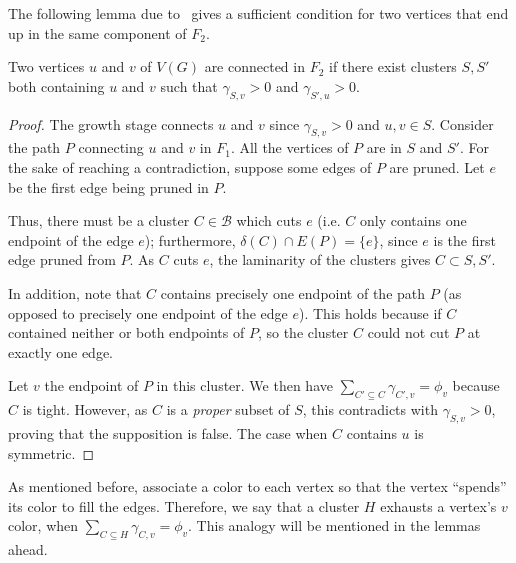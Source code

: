 The following lemma due to~\cite{Bateni} gives a sufficient condition for two vertices that end up in the same component of \(F_2\).

\begin{flemma} \label{clustering_connecting_bateni_3_4}
    Two vertices \(u\) and \(v\) of \(V(G)\) are connected in \(F_2\) if there exist clusters \(S, S'\) both containing \(u\) and \(v\) such that \(\gamma_{S, v} > 0\) and \(\gamma_{S', u} > 0\).
\end{flemma}
\begin{proof}

    The growth stage connects \(u\) and \(v\) since \(\gamma_{S, v} > 0\) and \(u, v \in S\). Consider the path \(P\) connecting \(u\) and \(v\) in \(F_1\). All the vertices of \(P\) are in \(S\) and \(S'\). For the sake of reaching a contradiction, suppose some edges of \(P\) are pruned. Let \(e\) be the first edge being pruned in \(P\). 

    Thus, there must be a cluster \(C \in \mathcal{B}\) which cuts \(e\) (i.e. \(C\) only contains one endpoint of the edge \(e\)); furthermore, \(\delta(C) \cap E(P) = \{e\}\), since \(e\) is the first edge pruned from \(P\). As \(C\) cuts \(e\), the laminarity of the clusters gives \(C \subset S, S'\).

    In addition, note that \(C\) contains precisely one endpoint of the path \(P\) (as opposed to precisely one endpoint of the edge \(e\)). This holds because if \(C\) contained neither or both endpoints of \(P\), so the cluster \(C\) could not cut \(P\) at exactly one edge.

    Let \(v\) the endpoint of \(P\) in this cluster. We then have \(\sum_{C' \subseteq C} \gamma_{C',v} = \phi_v\) because \(C\) is tight. However, as \(C\) is a \textit{proper} subset of \(S\), this contradicts with \(\gamma_{S, v} > 0\), proving that the supposition is false. The case when \(C\) contains \(u\) is symmetric.
\end{proof}

As mentioned before, \citeauthor{Bateni} associate a color to each vertex so that the vertex ``spends'' its color to fill the edges. Therefore, we say that a cluster \(H\) exhausts a vertex's \(v\) color, when \(\sum_{C \subseteq H} \gamma_{C, v} = \phi_v\). This analogy will be mentioned in the lemmas ahead.

